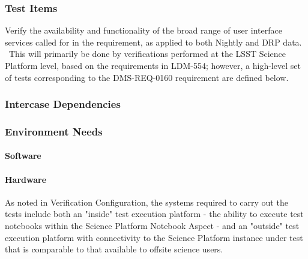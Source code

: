 \subsubsection{Test Items}
Verify the availability and functionality of the broad range of user
interface services called for in the requirement, as applied to both
Nightly and DRP data. ~This will primarily be done by verifications
performed at the LSST Science Platform level, based on the requirements
in LDM-554; however, a high-level set of tests corresponding to the
DMS-REQ-0160 requirement are defined below.



\subsubsection{Intercase Dependencies}

\subsubsection{Environment Needs}

\paragraph{Software}

\paragraph{Hardware}
As noted in Verification Configuration, the systems required to carry
out the tests include both an "inside" test execution platform - the
ability to execute test notebooks within the Science Platform Notebook
Aspect - and an "outside" test execution platform with connectivity to
the Science Platform instance under test that is comparable to that
available to offsite science users.


